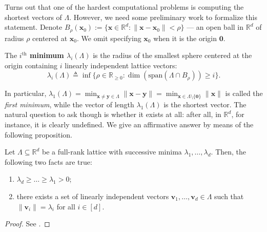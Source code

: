 \documentclass[../../book.tex]{subfiles}
\begin{document}
Turns out that one of the hardest computational problems is computing the shortest vectors of $\Lambda$.
However, we need some preliminary work to formalize this statement.
Denote $B_{\rho}(\mathbf{x}_0) := \{\mathbf{x} \in \mathbb{R}^d: \|\mathbf{x}-\mathbf{x}_0\|<\rho\}$ --- an open ball in $\mathbb{R}^d$ of radius $\rho$ centered at $\mathbf{x}_0$.
We omit specifying $\mathbf{x}_0$ when it is the origin $\mathbf{0}$.

\begin{definition}
    The \textbf{$i^{\text{th}}$ minimum $\lambda_i(\Lambda)$} is the radius 
    of the smallest sphere centered at the origin containing $i$ linearly 
    independent lattice vectors:
    \begin{equation*}
        \lambda_i(\Lambda) \triangleq \inf \{\rho \in \mathbb{R}_{\geq 0}: \dim(\text{span}(\Lambda \cap B_{\rho})) \geq i\}.
    \end{equation*}
\end{definition}

In particular, $\lambda_1(\Lambda) = \min_{\mathbf{x} \neq \mathbf{y} \in \Lambda}\|\mathbf{x}-\mathbf{y}\| = \min_{\mathbf{x} \in \Lambda\setminus\{\mathbf{0}\}}\|\mathbf{x}\|$ is called the \textit{first minimum}, while the vector of length $\lambda_1(\Lambda)$ is the shortest vector.
The natural question to ask though is whether it exists at all: after all, in $\mathbb{R}^d$, for instance, it is clearly undefined.
We give an affirmative answer by means of the following proposition.

\begin{proposition}\label{prop:lattice-minima-existence}
    Let $\Lambda \subseteq \mathbb{R}^d$ be a full-rank lattice with successive minima $\lambda_1, \dots, \lambda_d$.
    Then, the following two facts are true:
    \begin{enumerate}
        \item $\lambda_d \geq \ldots \geq \lambda_1 > 0$;
        \item there exists a set of linearly independent vectors $\mathbf{v}_1, \dots, \mathbf{v}_d \in \Lambda$ such that
        $\|\mathbf{v}_i\| = \lambda_i$ for all $i \in [d]$.
    \end{enumerate}
    
\end{proposition}

\begin{proof}
    See \cite[Theorem 1.2]{MicGol02}. 
\end{proof}
\end{document}
